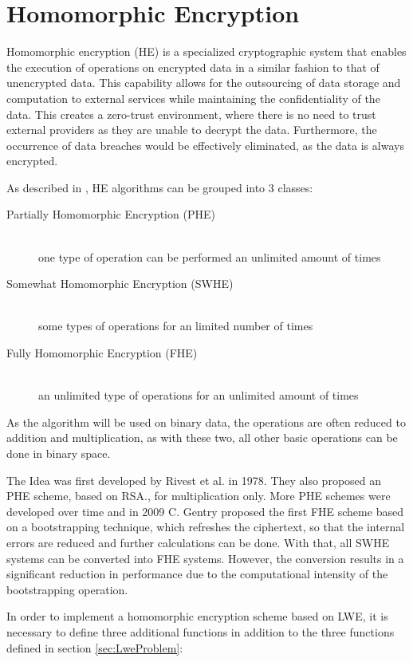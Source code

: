 \chapter{Homomorphic Encryption}

Homomorphic encryption (HE) is a specialized cryptographic system that enables the execution of operations on encrypted data in a similar fashion to that of unencrypted data. This capability allows for the outsourcing of data storage and computation to external services while maintaining the confidentiality of the data. This creates a zero-trust environment, where there is no need to trust external providers as they are unable to decrypt the data. Furthermore, the occurrence of data breaches would be effectively eliminated, as the data is always encrypted.


As described in \cite{FheImplementations}, HE algorithms can be grouped into 3 classes:
\begin{description}
  \item [Partially Homomorphic Encryption (PHE)]\hfill \\one type of operation can be performed an unlimited amount of times
  \item [Somewhat Homomorphic Encryption (SWHE)]\hfill \\some types of operations for an limited number of times
  \item [Fully Homomorphic Encryption (FHE)]\hfill \\an unlimited type of operations for an unlimited amount of times
\end{description}

As the algorithm will be used on binary data, the operations are often reduced to addition and multiplication, as with these two, all other basic operations can be done in binary space.

The Idea was first developed by Rivest et al. \cite{Rivest1978} in 1978. They also proposed an PHE scheme, based on RSA., for multiplication only. More PHE schemes were developed over time and in 2009 C. Gentry proposed the first FHE scheme \cite{Gentry2009AFH} based on a bootstrapping technique, which refreshes the ciphertext, so that the internal errors are reduced and further calculations can be done. With that, all SWHE systems can be converted into FHE systems. However, the conversion results in a significant reduction in performance due to the computational intensity of the bootstrapping operation.

In order to implement a homomorphic encryption scheme based on LWE, it is necessary to define three additional functions in addition to the three functions defined in section \ref{sec:LweProblem}:

